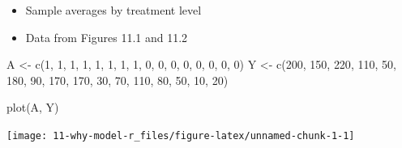 \documentclass[
  10pt,
  a4paper,
]{book}
\newenvironment{Shaded}{\begin{snugshade}}{\end{snugshade}}
\newcommand{\DecValTok}[1]{\textcolor[rgb]{0.68,0.00,0.00}{#1}}
\newcommand{\FunctionTok}[1]{\textcolor[rgb]{0.28,0.35,0.67}{#1}}
\newcommand{\NormalTok}[1]{\textcolor[rgb]{0.00,0.46,0.62}{#1}}
\newcommand{\OtherTok}[1]{\textcolor[rgb]{0.00,0.46,0.62}{#1}}
\providecommand{\tightlist}{%
  \setlength{\itemsep}{0pt}\setlength{\parskip}{0pt}}
\begin{document}
\begin{itemize}
\tightlist
\item
  Sample averages by treatment level
\item
  Data from Figures 11.1 and 11.2
\end{itemize}

\begin{Shaded}
\begin{Highlighting}[]
\NormalTok{A }\OtherTok{\textless{}{-}} \FunctionTok{c}\NormalTok{(}\DecValTok{1}\NormalTok{, }\DecValTok{1}\NormalTok{, }\DecValTok{1}\NormalTok{, }\DecValTok{1}\NormalTok{, }\DecValTok{1}\NormalTok{, }\DecValTok{1}\NormalTok{, }\DecValTok{1}\NormalTok{, }\DecValTok{1}\NormalTok{, }\DecValTok{0}\NormalTok{, }\DecValTok{0}\NormalTok{, }\DecValTok{0}\NormalTok{, }\DecValTok{0}\NormalTok{, }\DecValTok{0}\NormalTok{, }\DecValTok{0}\NormalTok{, }\DecValTok{0}\NormalTok{, }\DecValTok{0}\NormalTok{)}
\NormalTok{Y }\OtherTok{\textless{}{-}} \FunctionTok{c}\NormalTok{(}\DecValTok{200}\NormalTok{, }\DecValTok{150}\NormalTok{, }\DecValTok{220}\NormalTok{, }\DecValTok{110}\NormalTok{, }\DecValTok{50}\NormalTok{, }\DecValTok{180}\NormalTok{, }\DecValTok{90}\NormalTok{, }\DecValTok{170}\NormalTok{, }\DecValTok{170}\NormalTok{, }\DecValTok{30}\NormalTok{,}
       \DecValTok{70}\NormalTok{, }\DecValTok{110}\NormalTok{, }\DecValTok{80}\NormalTok{, }\DecValTok{50}\NormalTok{, }\DecValTok{10}\NormalTok{, }\DecValTok{20}\NormalTok{)}

\FunctionTok{plot}\NormalTok{(A, Y)}
\end{Highlighting}
\end{Shaded}

\begin{center}\texttt{[image: 11-why-model-r\_files/figure-latex/unnamed-chunk-1-1]} \end{center}
\end{document}
